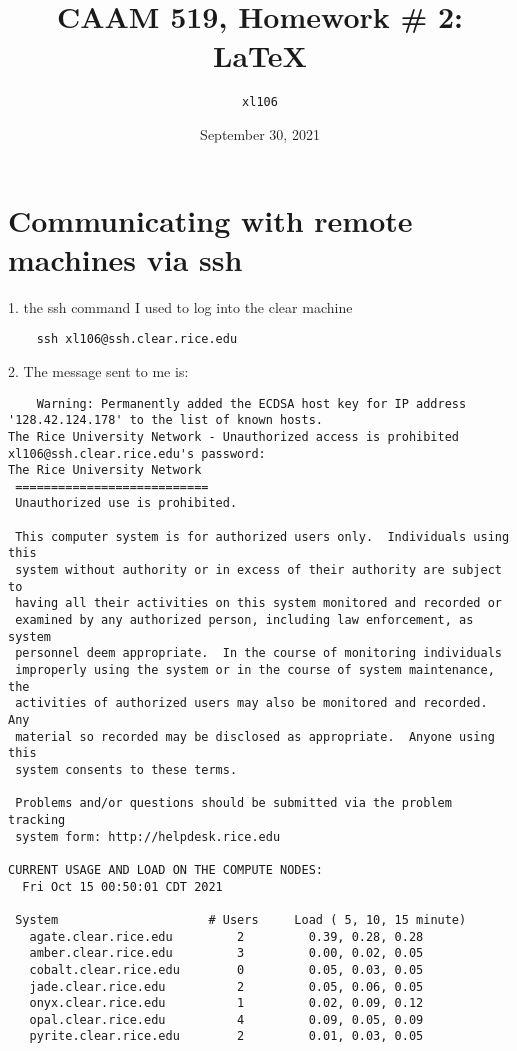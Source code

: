 \documentclass{article}
\title{CAAM 519, Homework \# 2: \LaTeX \Submission}
\author{\texttt{xl106}}
\date{September 30, 2021}
\begin{document}
\maketitle


\section{Communicating with remote machines via ssh}
1. the ssh command I used to log into the clear machine
\begin{verbatim}
    ssh xl106@ssh.clear.rice.edu
\end{verbatim}

2. The message sent to me is:
\begin{verbatim}
    Warning: Permanently added the ECDSA host key for IP address '128.42.124.178' to the list of known hosts.
The Rice University Network - Unauthorized access is prohibited
xl106@ssh.clear.rice.edu's password: 
The Rice University Network
 ===========================
 Unauthorized use is prohibited.
 
 This computer system is for authorized users only.  Individuals using this
 system without authority or in excess of their authority are subject to
 having all their activities on this system monitored and recorded or
 examined by any authorized person, including law enforcement, as system
 personnel deem appropriate.  In the course of monitoring individuals
 improperly using the system or in the course of system maintenance, the
 activities of authorized users may also be monitored and recorded.  Any
 material so recorded may be disclosed as appropriate.  Anyone using this
 system consents to these terms.
 
 Problems and/or questions should be submitted via the problem tracking
 system form: http://helpdesk.rice.edu
 
CURRENT USAGE AND LOAD ON THE COMPUTE NODES:
  Fri Oct 15 00:50:01 CDT 2021

 System                   	# Users   	Load ( 5, 10, 15 minute)      
   agate.clear.rice.edu   	    2     	  0.39, 0.28, 0.28            
   amber.clear.rice.edu   	    3     	  0.00, 0.02, 0.05            
   cobalt.clear.rice.edu  	    0     	  0.05, 0.03, 0.05            
   jade.clear.rice.edu    	    2     	  0.05, 0.06, 0.05            
   onyx.clear.rice.edu    	    1     	  0.02, 0.09, 0.12            
   opal.clear.rice.edu    	    4     	  0.09, 0.05, 0.09            
   pyrite.clear.rice.edu  	    2     	  0.01, 0.03, 0.05            


\end{verbatim}
\end{document}
